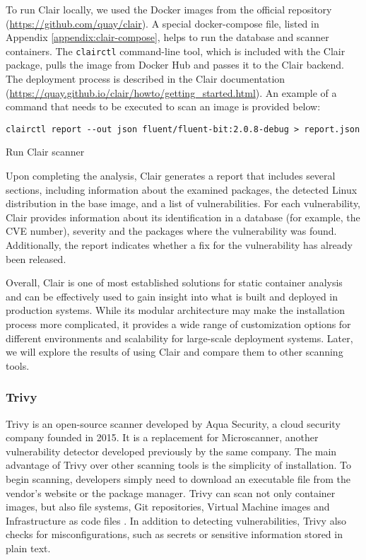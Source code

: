 To run Clair locally, we used the Docker images from the official repository (\url{https://github.com/quay/clair}). A special docker-compose file, listed in Appendix \ref{appendix:clair-compose}, helps to run the database and scanner containers. The \texttt{clairctl} command-line tool, which is included with the Clair package, pulls the image from Docker Hub and passes it to the Clair backend. The deployment process is described in the Clair documentation (\url{https://quay.github.io/clair/howto/getting_started.html}). An example of a command that needs to be executed to scan an image is provided below:

\begin{listing}[htp]
    \centering
    \begin{minipage}{0.95\linewidth}
        \begin{verbatim}
clairctl report --out json fluent/fluent-bit:2.0.8-debug > report.json
        \end{verbatim}
    \end{minipage}
    \caption{Run Clair scanner}
    \label{lst:clair}
\end{listing}

Upon completing the analysis, Clair generates a report that includes several sections, including information about the examined packages, the detected Linux distribution in the base image, and a list of vulnerabilities. For each vulnerability, Clair provides information about its identification in a database (for example, the CVE number), severity and the packages where the vulnerability was found. Additionally, the report indicates whether a fix for the vulnerability has already been released.

Overall, Clair is one of most established solutions for static container analysis and can be effectively used to gain insight into what is built and deployed in production systems. While its modular architecture may make the installation process more complicated, it provides a wide range of customization options for different environments and scalability for large-scale deployment systems. Later, we will explore the results of using Clair and compare them to other scanning tools.

\subsubsection{Trivy}

Trivy is an open-source scanner developed by Aqua Security, a cloud security company founded in 2015. It is a replacement for Microscanner, another vulnerability detector developed previously by the same company. The main advantage of Trivy over other scanning tools is the simplicity of installation. To begin scanning, developers simply need to download an executable file from the vendor's website or the package manager. Trivy can scan not only container images, but also file systems, Git repositories, Virtual Machine images and Infrastructure as code files \cite{d:trivystart}. In addition to detecting vulnerabilities, Trivy also checks for misconfigurations, such as secrets or sensitive information stored in plain text.

